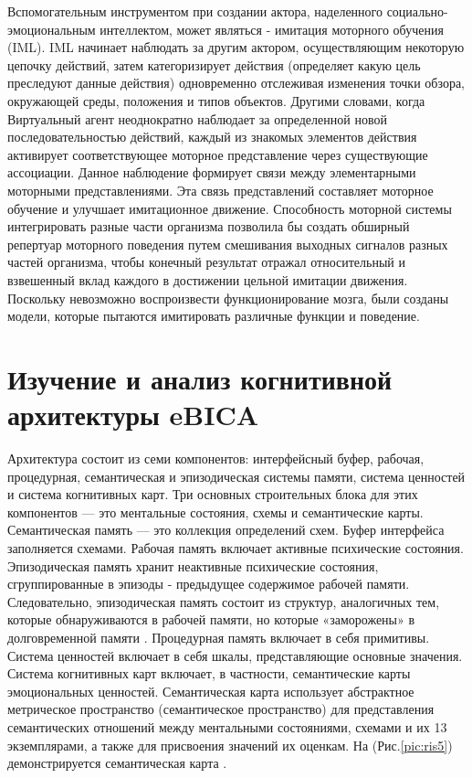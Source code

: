 Вспомогательным инструментом при создании актора, наделенного социально- эмоциональным интеллектом, 
может являться - имитация моторного обучения (IML). IML начинает наблюдать за другим актором, осуществляющим 
некоторую цепочку действий, затем категоризирует действия (определяет какую цель преследуют данные действия) 
одновременно отслеживая изменения точки обзора, окружающей среды, положения и типов объектов. Другими словами, 
когда Виртуальный агент неоднократно наблюдает за определенной новой последовательностью действий, каждый из 
знакомых элементов действия активирует соответствующее моторное представление через существующие ассоциации. 
Данное наблюдение формирует связи между элементарными моторными представлениями. Эта связь представлений 
составляет моторное обучение и улучшает имитационное движение. Способность моторной системы интегрировать 
разные части организма позволила бы создать обширный репертуар моторного поведения путем смешивания выходных 
сигналов разных частей организма, чтобы конечный результат отражал относительный и взвешенный вклад каждого в 
достижении цельной имитации движения. Поскольку невозможно воспроизвести функционирование мозга, были созданы 
модели, которые пытаются имитировать различные функции и поведение.
\section{Изучение и анализ когнитивной архитектуры eBICA}

Архитектура состоит из семи компонентов: интерфейсный буфер, рабочая, процедурная, семантическая 
и эпизодическая системы памяти, система ценностей и система когнитивных карт. Три основных строительных 
блока для этих компонентов — это ментальные состояния, схемы и семантические карты. 
Семантическая память — это коллекция определений схем. Буфер интерфейса заполняется схемами. 
Рабочая память включает активные психические состояния. Эпизодическая память хранит неактивные психические состояния,
сгруппированные в эпизоды - предыдущее содержимое рабочей памяти. Следовательно, эпизодическая память состоит из структур, 
аналогичных тем, которые обнаруживаются в рабочей памяти, но которые «заморожены» в долговременной памяти \cite{seman_karta}. Процедурная 
память включает в себя примитивы. Система ценностей включает в себя шкалы, представляющие основные значения. 
Система когнитивных карт включает, в частности, семантические карты эмоциональных ценностей. 
Семантическая карта использует абстрактное метрическое пространство (семантическое пространство) для представления
семантических отношений между ментальными состояниями, схемами и их 13 экземплярами, а также для присвоения значений их оценкам. 
На (Рис.\ref{pic:ris5}) демонстрируется семантическая карта \cite{seman_karta}.


